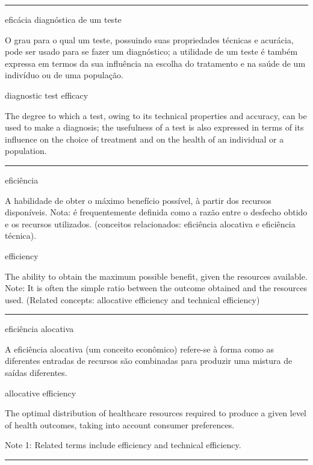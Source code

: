 \documentclass[
]{book}
\begin{document}
\begin{center}\rule{0.5\linewidth}{0.5pt}\end{center}

eficácia diagnóstica de um teste

O grau para o qual um teste, possuindo suas propriedades técnicas e acurácia, pode ser usado para se fazer um diagnóstico; a utilidade de um teste é também expressa em termos da sua influência na escolha do tratamento e na saúde de um indivíduo ou de uma população.

diagnostic test efficacy

The degree to which a test, owing to its technical properties and accuracy, can be used to make a diagnosis; the usefulness of a test is also expressed in terms of its influence on the choice of treatment and on the health of an individual or a population.

\begin{center}\rule{0.5\linewidth}{0.5pt}\end{center}

eficiência

A habilidade de obter o máximo benefício possível, à partir dos recursos disponíveis. Nota: é frequentemente definida como a razão entre o desfecho obtido e os recursos utilizados. (conceitos relacionados: eficiência alocativa e eficiência técnica).

efficiency

The ability to obtain the maximum possible benefit, given the resources available. Note: It is often the simple ratio between the outcome obtained and the resources used. (Related concepts: allocative efficiency and technical efficiency)

\begin{center}\rule{0.5\linewidth}{0.5pt}\end{center}

eficiência alocativa

A eficiência alocativa (um conceito econômico) refere-se à forma como as diferentes entradas de recursos são combinadas para produzir uma mistura de saídas diferentes.

allocative efficiency

The optimal distribution of healthcare resources required to produce a given level of health outcomes, taking into account consumer preferences.

Note 1: Related terms include efficiency and technical efficiency.

\begin{center}\rule{0.5\linewidth}{0.5pt}\end{center}
\end{document}
